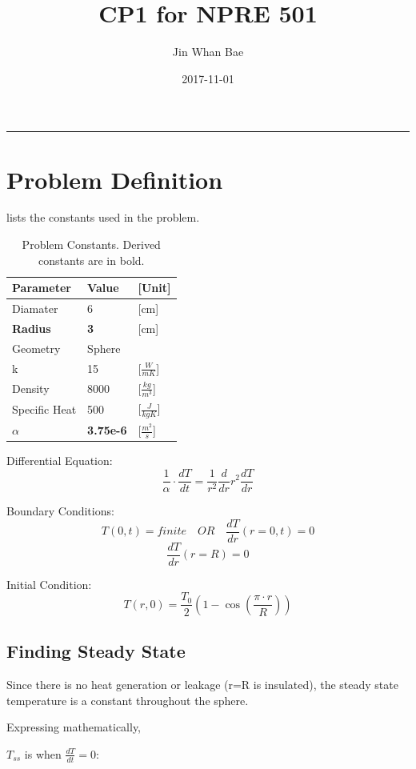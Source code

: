 \documentclass[12pt,letterpaper]{article}
\title{CP1 for NPRE 501}
\author{Jin Whan Bae}
\date{2017-11-01}
\begin{document}
	
	\maketitle
	\hrule
	\onehalfspacing
	\thispagestyle{empty}

\section{Problem Definition}

 lists the constants used in the problem.


\begin{table}[h]
     \centering
    \begin{tabularx}{\textwidth}{bbb}
       \hline
       Parameter & Value & [Unit] \\
       \hline
       Diamater & 6 & [cm] \\
       \textbf{Radius} & \textbf{3} & [cm] \\
       Geometry & Sphere \\
       k & 15 & [$ \frac{W}{mK} $] \\
       Density & 8000 & [$ \frac{kg}{m^3} $] \\
       Specific Heat & 500 & [$ \frac{J}{kgK} $] \\
       \textbf{$ \alpha$} & \textbf{3.75e-6} & [$ \frac{m^2}{s} $] \\
       \hline
    \end{tabularx}
    \caption {Problem Constants. Derived constants are in bold.}
    \label{tab:constants}
\end{table}

Differential Equation:
\[\frac{1}{\alpha} \cdot \frac{dT}{dt} = \frac{1}{r^2} \frac{d}{dr} r^2 \frac{dT}{dr}\]

Boundary Conditions:
\[T(0,t) = finite \quad OR \quad \frac{dT}{dr} (r = 0, t) = 0\]
\[\frac{dT}{dr} (r = R) = 0 \]

Initial Condition:
\[T(r,0) = \frac{T_0}{2} (1-\cos{(\frac{\pi \cdot r}{R})}) \]


\subsection{Finding Steady State}
Since there is no heat generation or leakage (r=R is insulated), 
the steady state temperature is a constant throughout the sphere.

Expressing mathematically,

$T_{ss}$ is when $\frac{dT}{dt} = 0 $:
\end{document}
